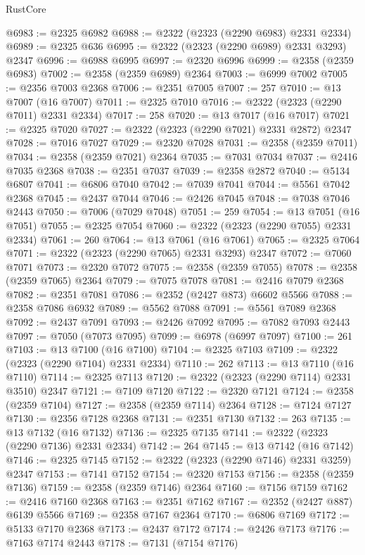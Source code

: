 \begin{lexlean}{RustCore}
\begin{coremodule}
@6983 := @2325 @6982
@6988 := @2322 (@2323 (@2290 @6983) @2331 @2334)
@6989 := @2325 @636
@6995 := @2322 (@2323 (@2290 @6989) @2331 @3293) @2347
@6996 := @6988 @6995
@6997 := @2320 @6996
@6999 := @2358 (@2359 @6983)
@7002 := @2358 (@2359 @6989) @2364
@7003 := @6999 @7002
@7005 := @2356 @7003 @2368
@7006 := @2351 @7005
@7007 := 257
@7010 := @13 @7007 (@16 @7007)
@7011 := @2325 @7010
@7016 := @2322 (@2323 (@2290 @7011) @2331 @2334)
@7017 := 258
@7020 := @13 @7017 (@16 @7017)
@7021 := @2325 @7020
@7027 := @2322 (@2323 (@2290 @7021) @2331 @2872) @2347
@7028 := @7016 @7027
@7029 := @2320 @7028
@7031 := @2358 (@2359 @7011)
@7034 := @2358 (@2359 @7021) @2364
@7035 := @7031 @7034
@7037 := @2416 @7035 @2368
@7038 := @2351 @7037
@7039 := @2358 @2872
@7040 := @5134 @6807
@7041 := @6806 @7040
@7042 := @7039 @7041
@7044 := @5561 @7042 @2368
@7045 := @2437 @7044
@7046 := @2426 @7045
@7048 := @7038 @7046 @2443
@7050 := @7006 (@7029 @7048)
@7051 := 259
@7054 := @13 @7051 (@16 @7051)
@7055 := @2325 @7054
@7060 := @2322 (@2323 (@2290 @7055) @2331 @2334)
@7061 := 260
@7064 := @13 @7061 (@16 @7061)
@7065 := @2325 @7064
@7071 := @2322 (@2323 (@2290 @7065) @2331 @3293) @2347
@7072 := @7060 @7071
@7073 := @2320 @7072
@7075 := @2358 (@2359 @7055)
@7078 := @2358 (@2359 @7065) @2364
@7079 := @7075 @7078
@7081 := @2416 @7079 @2368
@7082 := @2351 @7081
@7086 := @2352 (@2427 @873) @6602 @5566
@7088 := @2358 @7086 @6932
@7089 := @5562 @7088
@7091 := @5561 @7089 @2368
@7092 := @2437 @7091
@7093 := @2426 @7092
@7095 := @7082 @7093 @2443
@7097 := @7050 (@7073 @7095)
@7099 := @6978 (@6997 @7097)
@7100 := 261
@7103 := @13 @7100 (@16 @7100)
@7104 := @2325 @7103
@7109 := @2322 (@2323 (@2290 @7104) @2331 @2334)
@7110 := 262
@7113 := @13 @7110 (@16 @7110)
@7114 := @2325 @7113
@7120 := @2322 (@2323 (@2290 @7114) @2331 @3510) @2347
@7121 := @7109 @7120
@7122 := @2320 @7121
@7124 := @2358 (@2359 @7104)
@7127 := @2358 (@2359 @7114) @2364
@7128 := @7124 @7127
@7130 := @2356 @7128 @2368
@7131 := @2351 @7130
@7132 := 263
@7135 := @13 @7132 (@16 @7132)
@7136 := @2325 @7135
@7141 := @2322 (@2323 (@2290 @7136) @2331 @2334)
@7142 := 264
@7145 := @13 @7142 (@16 @7142)
@7146 := @2325 @7145
@7152 := @2322 (@2323 (@2290 @7146) @2331 @3259) @2347
@7153 := @7141 @7152
@7154 := @2320 @7153
@7156 := @2358 (@2359 @7136)
@7159 := @2358 (@2359 @7146) @2364
@7160 := @7156 @7159
@7162 := @2416 @7160 @2368
@7163 := @2351 @7162
@7167 := @2352 (@2427 @887) @6139 @5566
@7169 := @2358 @7167 @2364
@7170 := @6806 @7169
@7172 := @5133 @7170 @2368
@7173 := @2437 @7172
@7174 := @2426 @7173
@7176 := @7163 @7174 @2443
@7178 := @7131 (@7154 @7176)

\end{coremodule}
\end{lexlean}
